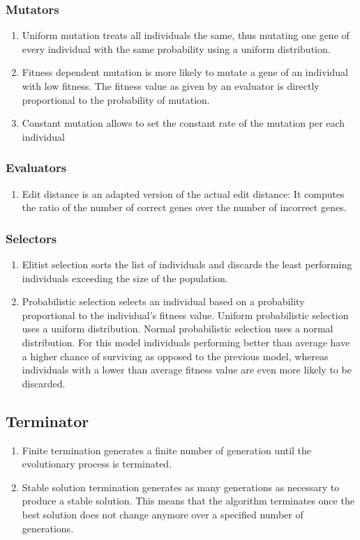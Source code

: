 \documentclass[a4paper,10pt]{article}
\begin{document}
\subsubsection{Mutators}
\begin{enumerate}
 \item Uniform mutation treats all individuals the same, thus mutating one gene of every individual with the same probability using a uniform distribution.
 \item Fitness dependent mutation is more likely to mutate a gene of an individual with low fitness. The fitness value as given by an evaluator is directly proportional to the probability of mutation.
 \item Constant mutation allows to set the constant rate of the mutation per each individual
\end{enumerate}

\subsubsection{Evaluators}
\begin{enumerate}
 \item Edit distance is an adapted version of the actual edit distance: It computes the ratio of the number of correct genes over the number of incorrect genes.
\end{enumerate}

\subsubsection{Selectors}
\begin{enumerate}
 \item Elitist selection sorts the list of individuals and discards the least performing individuals exceeding the size of the population.
 \item Probabilistic selection selects an individual based on a probability proportional to the individual's fitness value.
    \subitem Uniform probabilistic selection uses a uniform distribution.
    \subitem Normal probabilistic selection uses a normal distribution. For this model individuals performing better than average have a higher chance of surviving as opposed to the previous model, whereas individuals with a lower than average fitness value are even more likely to be discarded.
\end{enumerate}

\subsection{Terminator}
\begin{enumerate}
 \item Finite termination generates a finite number of generation until the evolutionary process is terminated.
 \item Stable solution termination generates as many generations as necessary to produce a stable solution. This means that the algorithm terminates once the best solution does not change anymore over a specified number of generations.
\end{enumerate}
\end{document}
